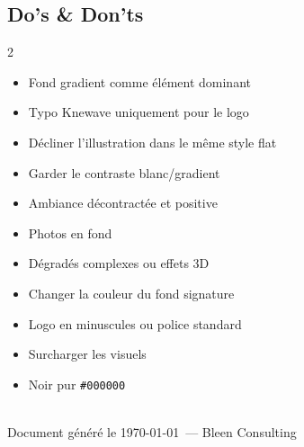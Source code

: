\documentclass[a4paper,11pt]{article}
\newcommand{\doitem}[1]{\item[\textcolor{bleenGreen}{\ding{51}}] #1}
\newcommand{\dontitem}[1]{\item[\textcolor{veloRed}{\ding{55}}] #1}
\begin{document}
\subsection{Do's \& Don'ts}

\begin{multicols}{2}
\begin{tcolorbox}[card, title={\color{bleenGreen!80!black}Do's}, colframe=bleenGreen!30, borderline north={2pt}{0pt}{bleenGreen}]
\begin{itemize}[nosep, leftmargin=16pt]
  \doitem{Fond gradient comme élément dominant}
  \doitem{Typo Knewave uniquement pour le logo}
  \doitem{Décliner l'illustration dans le même style flat}
  \doitem{Garder le contraste blanc/gradient}
  \doitem{Ambiance décontractée et positive}
\end{itemize}
\end{tcolorbox}

\begin{tcolorbox}[card, title={\color{veloRed}Don'ts}, colframe=veloRed!30, borderline north={2pt}{0pt}{veloRed}]
\begin{itemize}[nosep, leftmargin=16pt]
  \dontitem{Photos en fond}
  \dontitem{Dégradés complexes ou effets 3D}
  \dontitem{Changer la couleur du fond signature}
  \dontitem{Logo en minuscules ou police standard}
  \dontitem{Surcharger les visuels}
  \dontitem{Noir pur \texttt{\#000000}}
\end{itemize}
\end{tcolorbox}
\end{multicols}

\vfill

\begin{center}
\\[8pt]
{\small\color{grayMid} Document généré le \today\ — Bleen Consulting}
\end{center}
\end{document}
